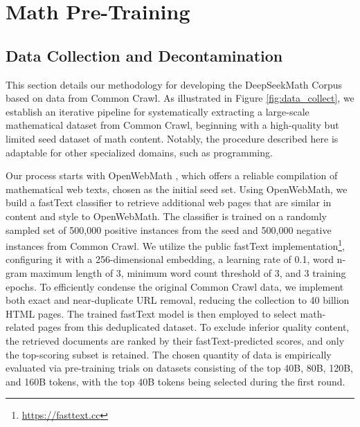 \section{Math Pre-Training}

\subsection{Data Collection and Decontamination} This section details our methodology for developing the DeepSeekMath Corpus based on data from Common Crawl. As illustrated in Figure \ref{fig:data_collect}, we establish an iterative pipeline for systematically extracting a large-scale mathematical dataset from Common Crawl, beginning with a high-quality but limited seed dataset of math content. Notably, the procedure described here is adaptable for other specialized domains, such as programming.

Our process starts with OpenWebMath \citep{openwebmath}, which offers a reliable compilation of mathematical web texts, chosen as the initial seed set. Using OpenWebMath, we build a fastText classifier \citep{joulin2016fasttext} to retrieve additional web pages that are similar in content and style to OpenWebMath. The classifier is trained on a randomly sampled set of 500,000 positive instances from the seed and 500,000 negative instances from Common Crawl. We utilize the public fastText implementation\footnote{\url{https://fasttext.cc}}, configuring it with a 256-dimensional embedding, a learning rate of 0.1, word n-gram maximum length of 3, minimum word count threshold of 3, and 3 training epochs. To efficiently condense the original Common Crawl data, we implement both exact and near-duplicate URL removal, reducing the collection to 40 billion HTML pages. The trained fastText model is then employed to select math-related pages from this deduplicated dataset. To exclude inferior quality content, the retrieved documents are ranked by their fastText-predicted scores, and only the top-scoring subset is retained. The chosen quantity of data is empirically evaluated via pre-training trials on datasets consisting of the top 40B, 80B, 120B, and 160B tokens, with the top 40B tokens being selected during the first round.

